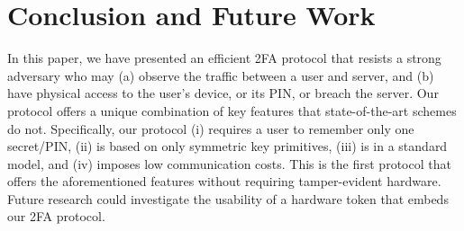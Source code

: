 

\section{Conclusion and Future Work}

In this paper, we have presented an efficient 2FA protocol that resists a strong adversary who may (a) observe the traffic between a user and server, and (b) have physical access to the user’s device, or its PIN, or breach the server. Our protocol offers a unique combination of key features that state-of-the-art schemes do not. Specifically,  our protocol (i) requires a user to remember only one secret/PIN, (ii) is based on only symmetric key primitives, (iii) is in a standard model, and (iv) imposes low communication costs. This is the first protocol that offers the aforementioned features without requiring tamper-evident hardware. Future research could investigate the usability of a hardware token that embeds our 2FA protocol. 

